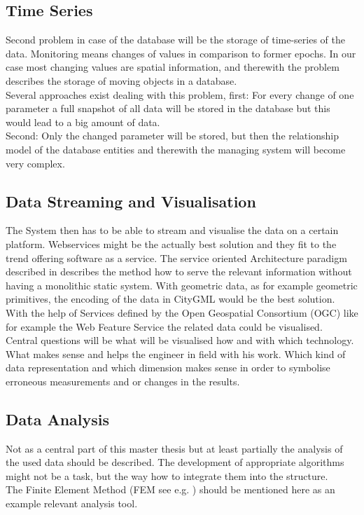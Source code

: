 \subsection{Time Series}
Second problem in case of the database will be the storage of time-series of the data. Monitoring means changes of values in comparison to former epochs. In our case most changing values are spatial information, and therewith the problem describes the storage of moving objects in a database.\\
Several approaches exist dealing with this problem, first: For every change of one parameter a full snapshot of all data will be stored in the database but this would lead to a big amount of data.\\
Second: Only the changed parameter will be stored, but then the relationship model of the database entities and therewith the managing system will become very complex. \citep{erwig_spatio-temporal_1999}\citep{koubarakis_spatio-temporal_2003}\citep{yuan_temporal_1996}
\subsection{Data Streaming and Visualisation}
The System then has to be able to stream and visualise the data on a certain platform. Webservices might be the actually best solution and they fit to the trend offering software as a service. The service oriented Architecture paradigm described in \citep{papazoglou_web_2008} describes the method how to serve the relevant information without having a monolithic static system. With geometric data, as for example geometric primitives, the encoding of the data in CityGML \citep{gerhard_groger_ogc_2012}\citep{kolbe_3d-geo-database_2009} would be the best solution. With the help of Services defined by the Open Geospatial Consortium (OGC) like for example the Web Feature Service \citep{panagiotis_a._vretanos_opengis_2005} \citep{jeff_de_la_beaujardiere_opengis_2006}\citep{douglas_nebert_opengis_2007}\citep{panagiotis_peter_a._vretanos_opengis_2010}\citep{thomas_h._kolbe_draft_2009} the related data could be visualised.\\
Central questions will be what will be visualised how and with which technology. What makes sense and helps the engineer in field with his work. Which kind of data representation and which dimension makes sense in order to symbolise erroneous measurements and or changes in the results.
\subsection{Data Analysis}
Not as a central part of this master thesis but at least partially the analysis of the used data should be described. The development of appropriate algorithms might not be a task, but the way how to integrate them into the structure.\\
The Finite Element Method  (FEM see e.g. \citep{zienkiewicz_finite_1977}) should be mentioned here as an example relevant analysis tool.
